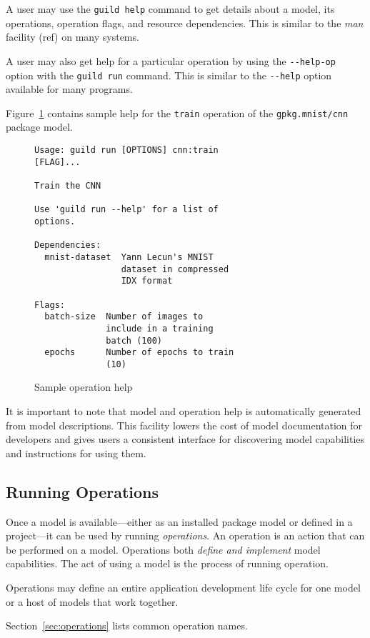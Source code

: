 \documentclass{article}
\begin{document}
A user may use the \verb|guild help| command to get details about a
model, its operations, operation flags, and resource
dependencies. This is similar to the \emph{man} facility (ref) on many
systems.

A user may also get help for a particular operation by using the
\verb|--help-op| option with the \verb|guild run| command. This is
similar to the \verb|--help| option available for many programs.

Figure~\ref{fig:op-help} contains sample help for the \verb|train|
operation of the \verb|gpkg.mnist/cnn| package model.

\begin{figure}
\begin{lstlisting}
Usage: guild run [OPTIONS] cnn:train
[FLAG]...

Train the CNN

Use 'guild run --help' for a list of
options.

Dependencies:
  mnist-dataset  Yann Lecun's MNIST
                 dataset in compressed
                 IDX format

Flags:
  batch-size  Number of images to
              include in a training
              batch (100)
  epochs      Number of epochs to train
              (10)
\end{lstlisting}
\caption{Sample operation help}
\label{fig:op-help}
\end{figure}

It is important to note that model and operation help is automatically
generated from model descriptions. This facility lowers the cost of
model documentation for developers and gives users a consistent
interface for discovering model capabilities and instructions for using
them.

\subsection{Running Operations}

Once a model is available---either as an installed package model or
defined in a project---it can be used by running \emph{operations}. An
operation is an action that can be performed on a model. Operations
both \emph{define and implement} model capabilities. The act of using
a model is the process of running operation.

Operations may define an entire application development life cycle for
one model or a host of models that work together.

Section~\ref{sec:operations} lists common operation names.
\end{document}
